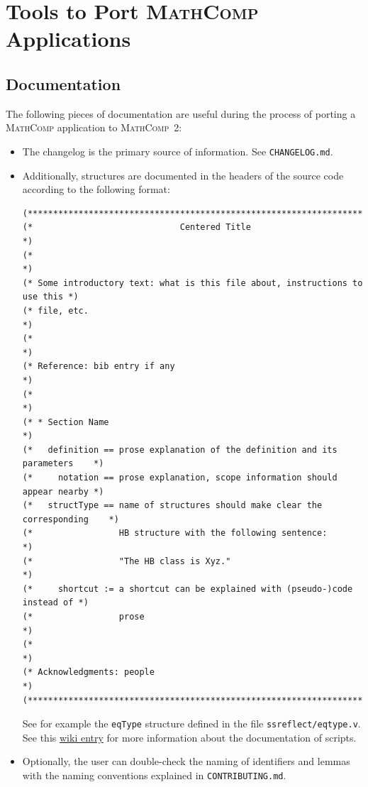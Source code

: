 \documentclass{article}
\def\mathcomp{\textsc{MathComp}}
\def\mathcomptwo{\mathcomp~2}
\def\coqin#1{\texttt{#1}}
\begin{document}
\section{Tools to Port \mathcomp{} Applications}
\label{sec:explore}

\subsection{Documentation}

The following pieces of documentation are useful during the process of
porting a \mathcomp{} application to \mathcomptwo:
\begin{itemize}
\item The changelog is the primary source of information. See \coqin{CHANGELOG.md}.
\item Additionally, structures are documented in the headers of the
  source code according to the following format:
\begin{verbatim}
(*****************************************************************************)
(*                             Centered Title                                *)
(*                                                                           *)
(* Some introductory text: what is this file about, instructions to use this *)
(* file, etc.                                                                *)
(*                                                                           *)
(* Reference: bib entry if any                                               *)
(*                                                                           *)
(* * Section Name                                                            *)
(*   definition == prose explanation of the definition and its parameters    *)
(*     notation == prose explanation, scope information should appear nearby *)
(*   structType == name of structures should make clear the corresponding    *)
(*                 HB structure with the following sentence:                 *) 
(*                 "The HB class is Xyz."                                    *)
(*     shortcut := a shortcut can be explained with (pseudo-)code instead of *)
(*                 prose                                                     *)
(*                                                                           *)
(* Acknowledgments: people                                                   *)
(*****************************************************************************)    
\end{verbatim}
See for example the \coqin{eqType} structure defined in the file
\coqin{ssreflect/eqtype.v}.
%
See this
\href{https://github.com/math-comp/analysis/wiki/How-to-document}{wiki
  entry} for more information about the documentation of scripts.
\item Optionally, the user can double-check the naming of identifiers
  and lemmas with the naming conventions explained in
  \coqin{CONTRIBUTING.md}.
\end{itemize}
\end{document}
